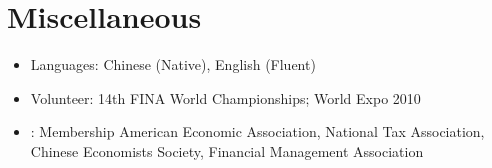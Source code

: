 \documentclass{resume}
\begin{document}




\section{Miscellaneous}
\begin{itemize}[parsep=0.25ex]
  \item Languages: 
  Chinese (Native), English (Fluent)
  
  \item Volunteer:
  14th FINA World Championships; World Expo 2010
  
  \item: Membership
American Economic Association, National Tax Association, Chinese Economists Society, Financial Management Association

\end{itemize}

%
%
\end{document}

